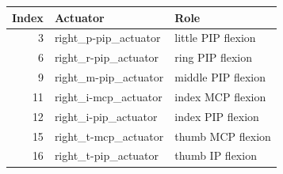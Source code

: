 \begin{tabular}{rll}
\toprule
Index & Actuator & Role \\
\midrule
3 & right\_p-pip\_actuator & little PIP flexion \\
6 & right\_r-pip\_actuator & ring PIP flexion \\
9 & right\_m-pip\_actuator & middle PIP flexion \\
11 & right\_i-mcp\_actuator & index MCP flexion \\
12 & right\_i-pip\_actuator & index PIP flexion \\
15 & right\_t-mcp\_actuator & thumb MCP flexion \\
16 & right\_t-pip\_actuator & thumb IP flexion \\
\bottomrule
\end{tabular}
